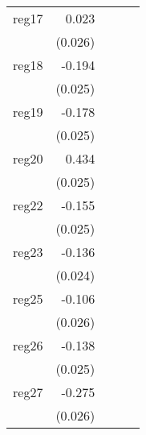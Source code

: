 {\begin{longtable}{l*{4}{D{.}{.}{-1}}}
\addlinespace
reg17       &       0.023         &                     &                     &                     \\
            &     (0.026)         &                     &                     &                     \\
\addlinespace
reg18       &      -0.194\sym{***}&                     &                     &                     \\
            &     (0.025)         &                     &                     &                     \\
\addlinespace
reg19       &      -0.178\sym{***}&                     &                     &                     \\
            &     (0.025)         &                     &                     &                     \\
\addlinespace
reg20       &       0.434\sym{***}&                     &                     &                     \\
            &     (0.025)         &                     &                     &                     \\
\addlinespace
reg22       &      -0.155\sym{***}&                     &                     &                     \\
            &     (0.025)         &                     &                     &                     \\
\addlinespace
reg23       &      -0.136\sym{***}&                     &                     &                     \\
            &     (0.024)         &                     &                     &                     \\
\addlinespace
reg25       &      -0.106\sym{***}&                     &                     &                     \\
            &     (0.026)         &                     &                     &                     \\
\addlinespace
reg26       &      -0.138\sym{***}&                     &                     &                     \\
            &     (0.025)         &                     &                     &                     \\
\addlinespace
reg27       &      -0.275\sym{***}&                     &                     &                     \\
            &     (0.026)         &                     &                     &                     \\

\end{longtable}}
